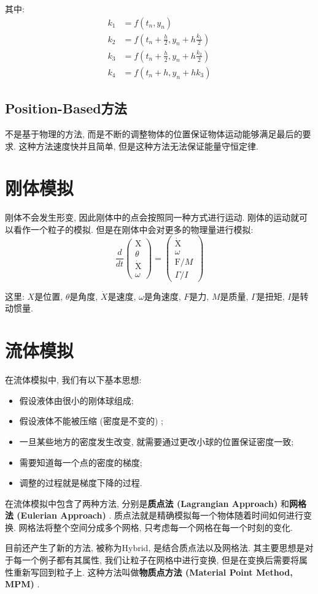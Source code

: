其中: 
\begin{equation}
	\begin{split}
		k_{1} &=f\left(t_{n}, y_{n}\right) \\
		k_{2} &=f\left(t_{n}+\frac{h}{2}, y_{n}+h \frac{k_{1}}{2}\right) \\
		k_{3} &=f\left(t_{n}+\frac{h}{2}, y_{n}+h \frac{k_{2}}{2}\right) \\
		k_{4} &=f\left(t_{n}+h, y_{n}+h k_{3}\right)
	\end{split}
\end{equation}

\subsection{Position-Based方法}

不是基于物理的方法, 而是不断的调整物体的位置保证物体运动能够满足最后的要求. 这种方法速度快并且简单, 但是这种方法无法保证能量守恒定律. 

\section{刚体模拟}

刚体不会发生形变, 因此刚体中的点会按照同一种方式进行运动. 刚体的运动就可以看作一个粒子的模拟. 但是在刚体中会对更多的物理量进行模拟: 
\begin{equation}
	\frac{d}{d t}\left(\begin{array}{c}
		\mathrm{X} \\
		\theta \\
		\dot{\mathrm{X}} \\
		\omega
	\end{array}\right)=\left(\begin{array}{c}
		\dot{\mathrm{X}} \\
		\omega \\
		\mathrm{F} / M \\
		\Gamma / I
	\end{array}\right)
\end{equation}

这里: $X$是位置, $\theta$是角度, $\dot{X}$是速度, $\omega$是角速度, $F$是力, $M$是质量, $\Gamma$是扭矩, $I$是转动惯量. 

\section{流体模拟}

在流体模拟中, 我们有以下基本思想: 
\begin{itemize}
	\item 假设液体由很小的刚体球组成; 
	\item 假设液体不能被压缩 (密度是不变的) ; 
	\item 一旦某些地方的密度发生改变, 就需要通过更改小球的位置保证密度一致; 
	\item 需要知道每一个点的密度的梯度; 
	\item 调整的过程就是梯度下降的过程. 
\end{itemize}

在流体模拟中包含了两种方法, 分别是\textbf{质点法 (Lagrangian Approach) }和\textbf{网格法 (Eulerian Approach) }. 质点法就是精确模拟每一个物体随着时间如何进行变换. 网格法将整个空间分成多个网格, 只考虑每一个网格在每一个时刻的变化. 

目前还产生了新的方法, 被称为Hybrid, 是结合质点法以及网格法. 其主要思想是对于每一个例子都有其属性, 我们让粒子在网格中进行变换, 但是在变换后需要将属性重新写回到粒子上. 这种方法叫做\textbf{物质点方法 (Material Point Method,  MPM) }. 
